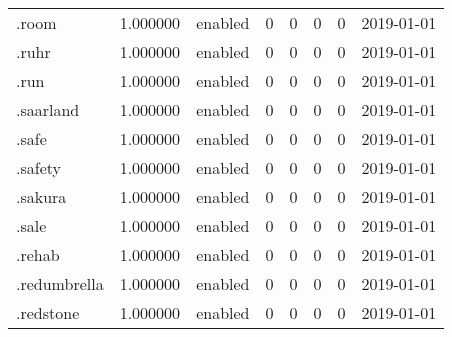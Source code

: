 \begin{tabular}{lrlrrrrl}
.room                     &          1.000000 &         enabled &                           0 &                           0 &                           0 &                   0 &           2019-01-01 \\
.ruhr                     &          1.000000 &         enabled &                           0 &                           0 &                           0 &                   0 &           2019-01-01 \\
.run                      &          1.000000 &         enabled &                           0 &                           0 &                           0 &                   0 &           2019-01-01 \\
.saarland                 &          1.000000 &         enabled &                           0 &                           0 &                           0 &                   0 &           2019-01-01 \\
.safe                     &          1.000000 &         enabled &                           0 &                           0 &                           0 &                   0 &           2019-01-01 \\
.safety                   &          1.000000 &         enabled &                           0 &                           0 &                           0 &                   0 &           2019-01-01 \\
.sakura                   &          1.000000 &         enabled &                           0 &                           0 &                           0 &                   0 &           2019-01-01 \\
.sale                     &          1.000000 &         enabled &                           0 &                           0 &                           0 &                   0 &           2019-01-01 \\
.rehab                    &          1.000000 &         enabled &                           0 &                           0 &                           0 &                   0 &           2019-01-01 \\
.redumbrella              &          1.000000 &         enabled &                           0 &                           0 &                           0 &                   0 &           2019-01-01 \\
.redstone                 &          1.000000 &         enabled &                           0 &                           0 &                           0 &                   0 &           2019-01-01 \\

\end{tabular}
